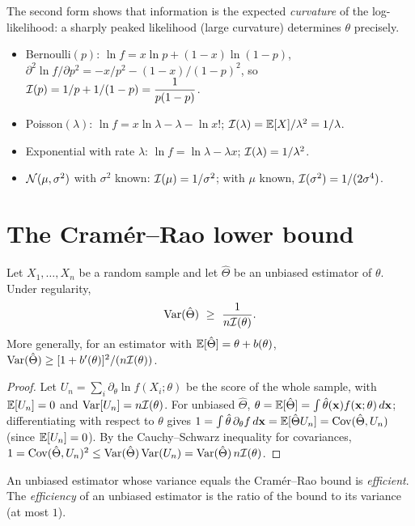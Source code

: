 The second form shows that information is the expected \emph{curvature} of the log-likelihood: a sharply peaked likelihood (large curvature) determines $\theta$ precisely.

\begin{example}\label{ex:fisher}
\begin{itemize}
  \item Bernoulli$(p)$: $\ln f=x\ln p+(1-x)\ln(1-p)$, $\partial^2\ln f/\partial p^2=-x/p^2-(1-x)/(1-p)^2$, so $\mathcal{I}(p)=1/p+1/(1-p)=\dfrac1{p(1-p)}$.
  \item Poisson$(\lambda)$: $\ln f=x\ln\lambda-\lambda-\ln x!$; $\mathcal{I}(\lambda)=\mathbb{E}[X]/\lambda^2=1/\lambda$.
  \item Exponential with rate $\lambda$: $\ln f=\ln\lambda-\lambda x$; $\mathcal{I}(\lambda)=1/\lambda^2$.
  \item $\mathcal{N}(\mu,\sigma^2)$ with $\sigma^2$ known: $\mathcal{I}(\mu)=1/\sigma^2$; with $\mu$ known, $\mathcal{I}(\sigma^2)=1/(2\sigma^4)$.
\end{itemize}
\end{example}

\section{The Cram\'er--Rao lower bound}

\begin{theorem}\label{thm:cramerrao}
Let $X_1,\dots,X_n$ be a random sample and let $\hat\Theta$ be an unbiased estimator of $\theta$. Under regularity,
\[ \Var(\hat\Theta)\ \ge\ \frac1{n\Fish(\theta)}. \]
More generally, for an estimator with $\mathbb{E}[\hat\Theta]=\theta+b(\theta)$, $\operatorname{Var}(\hat\Theta)\ge[1+b'(\theta)]^2/(n\mathcal{I}(\theta))$.
\end{theorem}

\begin{proof}
Let $U_n=\sum_i\partial_\theta\ln f(X_i;\theta)$ be the score of the whole sample, with $\mathbb{E}[U_n]=0$ and $\operatorname{Var}[U_n]=n\mathcal{I}(\theta)$. For unbiased $\hat\Theta$, $\theta=\mathbb{E}[\hat\Theta]=\int\hat\theta(\mathbf{x})f(\mathbf{x};\theta)\,d\mathbf{x}$; differentiating with respect to $\theta$ gives $1=\int\hat\theta\,\partial_\theta f\,d\mathbf{x}=\mathbb{E}[\hat\Theta U_n]=\operatorname{Cov}(\hat\Theta,U_n)$ (since $\mathbb{E}[U_n]=0$). By the Cauchy--Schwarz inequality for covariances, $1=\operatorname{Cov}(\hat\Theta,U_n)^2\le\operatorname{Var}(\hat\Theta)\operatorname{Var}(U_n)=\operatorname{Var}(\hat\Theta)\,n\mathcal{I}(\theta)$.
\end{proof}

\begin{definition}
An unbiased estimator whose variance equals the Cram\'er--Rao bound is \emph{efficient}. The \emph{efficiency} of an unbiased estimator is the ratio of the bound to its variance (at most $1$).
\end{definition}

